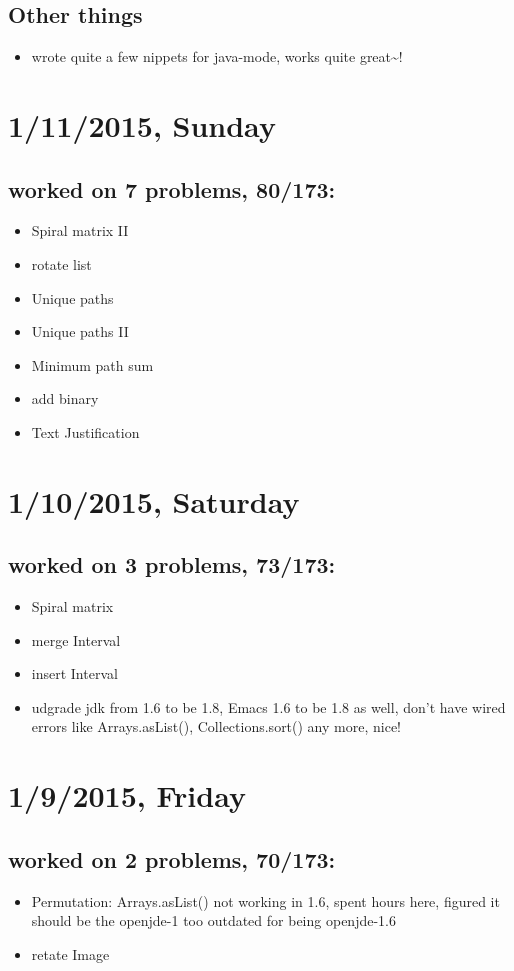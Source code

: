 \documentclass[9pt,b5paper]{article}
\begin{document}
\subsection{Other things}
\label{sec-12-2}
\begin{itemize}
\item wrote quite a few nippets for java-mode, works quite great\textasciitilde{}!
\end{itemize}
\section{1/11/2015, Sunday}
\label{sec-13}
\subsection{worked on 7 problems, 80/173:}
\label{sec-13-1}
\begin{itemize}
\item Spiral matrix II
\item rotate list
\item Unique paths
\item Unique paths II
\item Minimum path sum
\item add binary
\item Text Justification
\end{itemize}
\section{1/10/2015, Saturday}
\label{sec-14}
\subsection{worked on 3 problems, 73/173:}
\label{sec-14-1}
\begin{itemize}
\item Spiral matrix
\item merge Interval
\item insert Interval
\item udgrade jdk from 1.6 to be 1.8, Emacs 1.6 to be 1.8 as well, don't have wired errors like Arrays.asList(), Collections.sort() any more, nice!
\end{itemize}
\section{1/9/2015, Friday}
\label{sec-15}
\subsection{worked on 2 problems, 70/173:}
\label{sec-15-1}
\begin{itemize}
\item Permutation: Arrays.asList() not working in 1.6, spent hours here, figured it should be the openjde-1 too outdated for being openjde-1.6
\item retate Image
\end{itemize}
\end{document}
